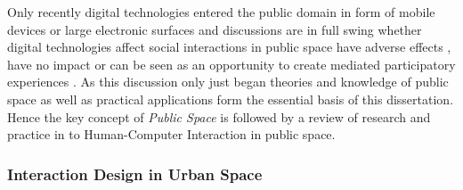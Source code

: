 


Only recently digital technologies entered the public domain in form of mobile devices or large electronic surfaces and discussions are in full swing whether digital technologies affect social interactions in public space have adverse effects \cite{Turkle_2012}, have no impact \cite{Hampton_2015} or can be seen as an opportunity to create mediated participatory experiences \cite{Gordon_2011}. As this discussion only just began theories and knowledge of public space as well as practical applications form the essential basis of this dissertation. Hence the key concept of \textit{Public Space} is followed by a review of research and practice in to Human-Computer Interaction in public space.     


\subsubsection* {Interaction Design in Urban Space} 

